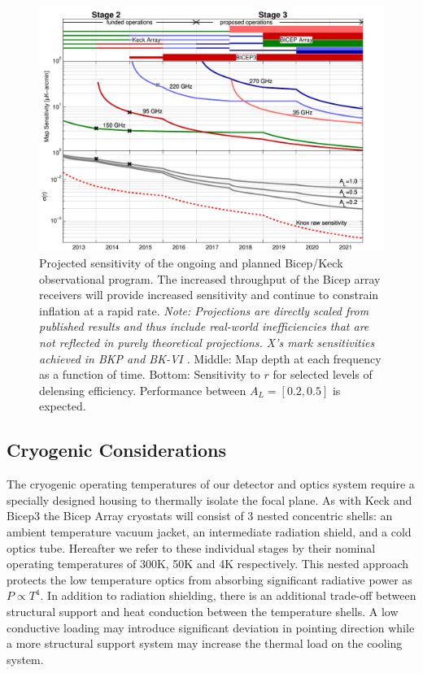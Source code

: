 \documentclass[12pt]{article}
\begin{document}
\begin{figure}[ht]
	\center
	\includegraphics[width=.6\textwidth]{bk_projections.pdf}
	\caption{Projected sensitivity of the ongoing and planned Bicep/Keck
	observational program. The increased throughput of the Bicep array
	receivers will provide increased sensitivity and continue to constrain
	inflation at a rapid rate. \textit{Note: Projections are directly scaled
	from published results and thus include real-world inefficiencies that are
	not reflected in purely theoretical projections. X's mark sensitivities
	achieved in BKP and BK-VI \cite{BK6, cite:BKP}}. Middle: Map depth at each
	frequency as a function of time. Bottom: Sensitivity to $r$ for selected
	levels of delensing efficiency. Performance between $A_L = [0.2, 0.5]$ is
	expected.}
	\label{fig:projections}
\end{figure}


\subsection{Cryogenic Considerations}
The cryogenic operating temperatures of our detector and optics system require
a specially designed housing to thermally isolate the focal plane. As with
Keck and Bicep3 the Bicep Array cryostats will consist of 3 nested concentric
shells: an ambient temperature vacuum jacket, an intermediate radiation shield, and a 
cold optics tube. Hereafter we refer to these individual stages by their nominal
operating temperatures of 300K, 50K and 4K respectively. This nested approach protects the
low temperature optics from absorbing significant radiative power as
$P\propto T^4$.  In addition to radiation shielding, there is an
additional trade-off between structural support and heat conduction between
the temperature shells. A low conductive loading may introduce significant
deviation in pointing direction while a more structural support system may increase the
thermal load on the cooling system. 
\end{document}
